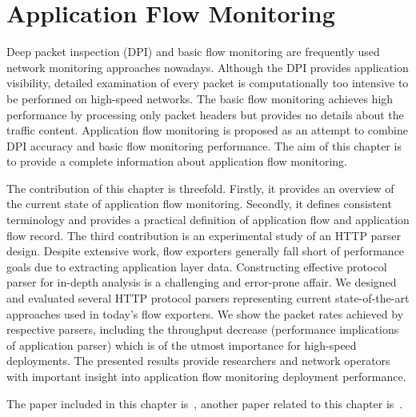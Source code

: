 \chapter{Application Flow Monitoring}\label{chap:application-flow-monitoring}

\begin{chapintro}

Deep packet inspection (DPI) and basic flow monitoring are frequently used network monitoring approaches nowadays. Although the DPI provides application visibility, detailed examination of every packet is computationally too intensive to be performed on high-speed networks. The basic flow monitoring achieves high performance by processing only packet headers but provides no details about the traffic content. Application flow monitoring is proposed as an attempt to combine DPI accuracy and basic flow monitoring performance. The aim of this chapter is to provide a complete information about application flow monitoring. 

The contribution of this chapter is threefold. Firstly, it provides an overview of the current state of application flow monitoring. Secondly, it defines consistent terminology and provides a practical definition of application flow and application flow record. The third contribution is an experimental study of an HTTP parser design. Despite extensive work, flow exporters generally fall short of performance goals due to extracting application layer data. Constructing effective protocol parser for in-depth analysis is a challenging and error-prone affair. We designed and evaluated several HTTP protocol parsers representing current state-of-the-art approaches used in today's flow exporters. We show the packet rates achieved by respective parsers, including the throughput decrease (performance implications of application parser) which is of the utmost importance for high-speed deployments. The presented results provide researchers and network operators with important insight into application flow monitoring deployment performance.

The paper included in this chapter is~\cite{Velan-2013-Design}, another paper related to this chapter is~\cite{Velan-2014-Next}.


\end{chapintro}
